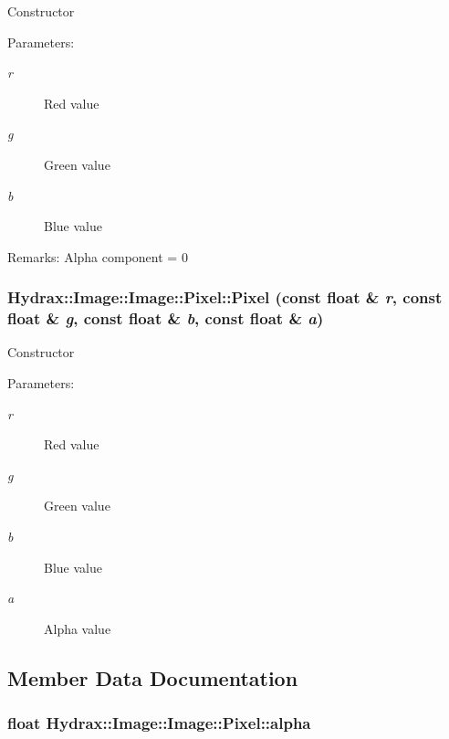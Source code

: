 Constructor \begin{Desc}
\item[Parameters:]
\begin{description}
\item[{\em r}]Red value \item[{\em g}]Green value \item[{\em b}]Blue value \end{description}
\end{Desc}
\begin{Desc}
\item[Remarks:]Alpha component = 0 \end{Desc}
\hypertarget{struct_hydrax_1_1_image_1_1_pixel_ea61a7146cef99ad5c706d6fda0c2601}{
\subsubsection[{Pixel}]{\setlength{\rightskip}{0pt plus 5cm}Hydrax::Image::Image::Pixel::Pixel (const float \& {\em r}, \/  const float \& {\em g}, \/  const float \& {\em b}, \/  const float \& {\em a})}}
\label{struct_hydrax_1_1_image_1_1_pixel_ea61a7146cef99ad5c706d6fda0c2601}


Constructor \begin{Desc}
\item[Parameters:]
\begin{description}
\item[{\em r}]Red value \item[{\em g}]Green value \item[{\em b}]Blue value \item[{\em a}]Alpha value \end{description}
\end{Desc}


\subsection{Member Data Documentation}
\hypertarget{struct_hydrax_1_1_image_1_1_pixel_7e6eb6af2e026d08811f14f26de0bc87}{
\subsubsection[{alpha}]{\setlength{\rightskip}{0pt plus 5cm}float Hydrax::Image::Image::Pixel::alpha}}
\label{struct_hydrax_1_1_image_1_1_pixel_7e6eb6af2e026d08811f14f26de0bc87}


